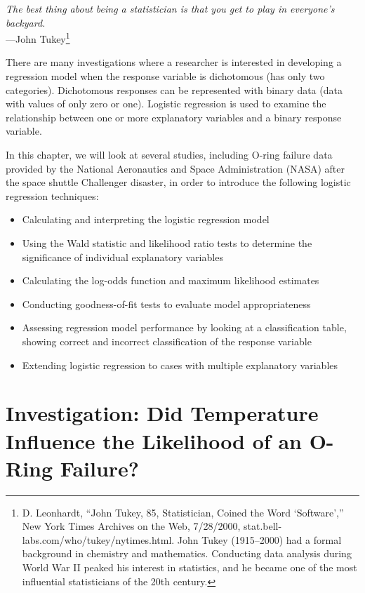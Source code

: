 \documentclass[
]{report}
\providecommand{\tightlist}{%
  \setlength{\itemsep}{0pt}\setlength{\parskip}{0pt}}
\begin{document}
{ \emph{The best thing about being a statistician is that you get to play in everyone's backyard.}}\\
{ ---John Tukey\footnote{D. Leonhardt, ``John Tukey, 85, Statistician, Coined the Word `Software','' New York Times Archives on the Web, 7/28/2000, stat.bell-labs.com/who/tukey/nytimes.html. John Tukey (1915--2000) had a formal background in chemistry and mathematics. Conducting data analysis during World War II peaked his interest in statistics, and he became one of the most influential statisticians of the 20th century.}}

There are many investigations where a researcher is interested in developing a regression model when the response variable is dichotomous (has only two categories). Dichotomous responses can be represented with binary data (data with values of only zero or one). Logistic regression is used to examine the relationship between one or more explanatory variables and a binary response variable.

In this chapter, we will look at several studies, including O-ring failure data provided by the National Aeronautics and Space Administration (NASA) after the space shuttle Challenger disaster, in order to introduce the following logistic regression techniques:

\begin{itemize}
\tightlist
\item
  Calculating and interpreting the logistic regression model\\
\item
  Using the Wald statistic and likelihood ratio tests to determine the significance of individual explanatory variables\\
\item
  Calculating the log-odds function and maximum likelihood estimates\\
\item
  Conducting goodness-of-fit tests to evaluate model appropriateness\\
\item
  Assessing regression model performance by looking at a classification table, showing correct and incorrect classification of the response variable\\
\item
  Extending logistic regression to cases with multiple explanatory variables
\end{itemize}

\hypertarget{investigation-did-temperature-influence-the-likelihood-of-an-o-ring-failure}{%
\section{\texorpdfstring{\textbf{Investigation: Did Temperature Influence the Likelihood of an O-Ring Failure?}}{Investigation: Did Temperature Influence the Likelihood of an O-Ring Failure?}}\label{investigation-did-temperature-influence-the-likelihood-of-an-o-ring-failure}}
\end{document}
